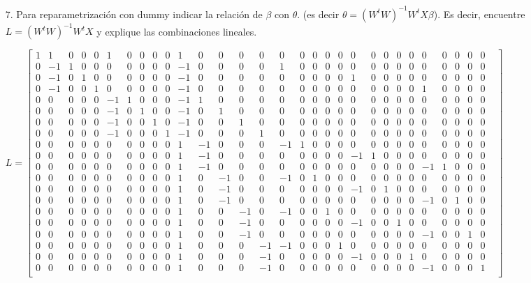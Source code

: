 \documentclass[10pt,a4paper]{report}
\begin{document}
\begin{enumerate}
    
    \item[7.] Para reparametrización con dummy indicar la relación de $\beta$ con $\theta$. (es decir $\theta = {\left({W}^{t}W\right)}^{-1}{W}^{t}X \beta $). Es decir, encuentre $L = {\left({W}^{t}W\right)}^{-1}{W}^{t}X $ y explique las combinaciones lineales.\\
    
\begin{tiny}   
$L=\begin{bmatrix}
1&1&0&0&0&1&0&0&0&0&1&0&0&0&0&0&0&0&0&0&0&0&0&0&0&0&0&0&0&0&\\
0&-1&1&0&0&0&0&0&0&0&-1&0&0&0&0&1&0&0&0&0&0&0&0&0&0&0&0&0&0&0&\\
0&-1&0&1&0&0&0&0&0&0&-1&0&0&0&0&0&0&0&0&0&1&0&0&0&0&0&0&0&0&0&\\
0&-1&0&0&1&0&0&0&0&0&-1&0&0&0&0&0&0&0&0&0&0&0&0&0&0&1&0&0&0&0&\\
0&0&0&0&0&-1&1&0&0&0&-1&1&0&0&0&0&0&0&0&0&0&0&0&0&0&0&0&0&0&0&\\
0&0&0&0&0&-1&0&1&0&0&-1&0&1&0&0&0&0&0&0&0&0&0&0&0&0&0&0&0&0&0&\\
0&0&0&0&0&-1&0&0&1&0&-1&0&0&1&0&0&0&0&0&0&0&0&0&0&0&0&0&0&0&0&\\
0&0&0&0&0&-1&0&0&0&1&-1&0&0&0&1&0&0&0&0&0&0&0&0&0&0&0&0&0&0&0&\\
0&0&0&0&0&0&0&0&0&0&1&-1&0&0&0&-1&1&0&0&0&0&0&0&0&0&0&0&0&0&0&\\
0&0&0&0&0&0&0&0&0&0&1&-1&0&0&0&0&0&0&0&0&-1&1&0&0&0&0&0&0&0&0&\\
0&0&0&0&0&0&0&0&0&0&1&-1&0&0&0&0&0&0&0&0&0&0&0&0&0&-1&1&0&0&0&\\
0&0&0&0&0&0&0&0&0&0&1&0&-1&0&0&-1&0&1&0&0&0&0&0&0&0&0&0&0&0&0&\\
0&0&0&0&0&0&0&0&0&0&1&0&-1&0&0&0&0&0&0&0&-1&0&1&0&0&0&0&0&0&0&\\
0&0&0&0&0&0&0&0&0&0&1&0&-1&0&0&0&0&0&0&0&0&0&0&0&0&-1&0&1&0&0&\\
0&0&0&0&0&0&0&0&0&0&1&0&0&-1&0&-1&0&0&1&0&0&0&0&0&0&0&0&0&0&0&\\
0&0&0&0&0&0&0&0&0&0&1&0&0&-1&0&0&0&0&0&0&-1&0&0&1&0&0&0&0&0&0&\\
0&0&0&0&0&0&0&0&0&0&1&0&0&-1&0&0&0&0&0&0&0&0&0&0&0&-1&0&0&1&0&\\
0&0&0&0&0&0&0&0&0&0&1&0&0&0&-1&-1&0&0&0&1&0&0&0&0&0&0&0&0&0&0&\\
0&0&0&0&0&0&0&0&0&0&1&0&0&0&-1&0&0&0&0&0&-1&0&0&0&1&0&0&0&0&0&\\
0&0&0&0&0&0&0&0&0&0&1&0&0&0&-1&0&0&0&0&0&0&0&0&0&0&-1&0&0&0&1&\\
\end{bmatrix}$
\end{tiny} \\


\end{enumerate}
\end{document}
